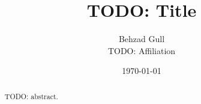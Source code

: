 \documentclass[11pt,a4paper]{article}
\title{TODO: Title}
\author{Behzad Gull \\ TODO: Affiliation}
\date{\today}
\begin{document}
\maketitle

\begin{abstract}
TODO: abstract.
\end{abstract}









\end{document}
